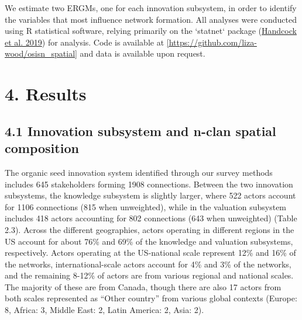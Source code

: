 \documentclass[twoside,12pt,final]{ucthesis-CA2012}
\begin{document}
\begin{ucmainmatter}
We estimate two ERGMs, one for each innovation subsystem, in order to
identify the variables that most influence network formation. All
analyses were conducted using R statistical software, relying primarily
on the `statnet` package
(\protect\hyperlink{ref-Handcock_Hunter_Butts_Goodreau_Krivitsky_Bender-deMoll_Morris_2019}{Handcock et al. 2019})
for analysis. Code is available at
\href{https://github.com/liza-wood/osisn_spatial}{{[}https://github.com/liza-wood/osisn\_spatial{]}}
and data is available upon request.

\hypertarget{results-1}{%
\section{4. Results}\label{results-1}}

\hypertarget{innovation-subsystem-and-n-clan-spatial-composition}{%
\subsection{4.1 Innovation subsystem and n-clan spatial composition}\label{innovation-subsystem-and-n-clan-spatial-composition}}

The organic seed innovation system identified through our survey methods
includes 645 stakeholders forming 1908 connections. Between the two
innovation subsystems, the knowledge subsystem is slightly larger, where
522 actors account for 1106 connections (815 when unweighted), while in
the valuation subsystem includes 418 actors accounting for 802
connections (643 when unweighted) (Table 2.3). Across the different
geographies, actors operating in different regions in the US account for
about 76\% and 69\% of the knowledge and valuation subsystems,
respectively. Actors operating at the US-national scale represent 12\%
and 16\% of the networks, international-scale actors account for 4\% and
3\% of the networks, and the remaining 8-12\% of actors are from various
regional and national scales. The majority of these are from Canada,
though there are also 17 actors from both scales represented as ``Other
country'' from various global contexts (Europe: 8, Africa: 3, Middle
East: 2, Latin America: 2, Asia: 2).
\begin{table}


\end{table}
\end{ucmainmatter}
\end{document}
